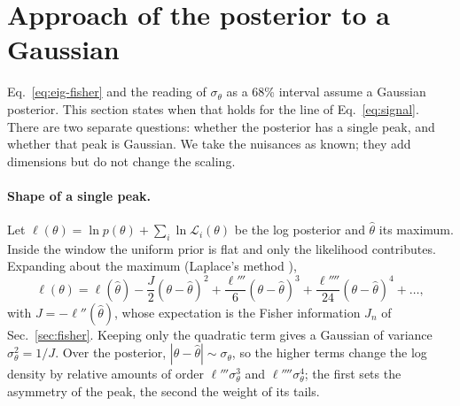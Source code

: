 \section{Approach of the posterior to a Gaussian}
\label{sm:gaussian}

Eq.~\eqref{eq:eig-fisher} and the reading of $\sigma_\theta$ as a 68\% interval assume a Gaussian posterior. This
section states when that holds for the line of Eq.~\eqref{eq:signal}. There are two separate questions: whether
the posterior has a single peak, and whether that peak is Gaussian. We take the nuisances as known; they add
dimensions but do not change the scaling.

\paragraph{Shape of a single peak.} Let $\ell(\theta)=\ln p(\theta)+\sum_i\ln\mathcal L_i(\theta)$ be the log
posterior and $\hat\theta$ its maximum. Inside the window the uniform prior is flat and only the likelihood
contributes. Expanding about the maximum (Laplace's method \cite{vandervaart1998}),
\begin{equation}
  \ell(\theta)=\ell(\hat\theta)-\frac{J}{2}(\theta-\hat\theta)^2+\frac{\ell'''}{6}(\theta-\hat\theta)^3
  +\frac{\ell''''}{24}(\theta-\hat\theta)^4+\dots,
  \label{eq:laplace}
\end{equation}
with $J=-\ell''(\hat\theta)$, whose expectation is the Fisher information $J_n$ of Sec.~\ref{sec:fisher}. Keeping only
the quadratic term gives a Gaussian of variance $\sigma_\theta^2=1/J$. Over the posterior,
$|\theta-\hat\theta|\sim\sigma_\theta$, so the higher terms change the log density by relative amounts of order
$\ell'''\sigma_\theta^3$ and $\ell''''\sigma_\theta^4$; the first sets the asymmetry of the peak, the second the weight
of its tails.

